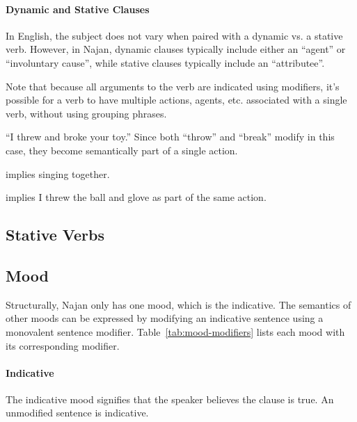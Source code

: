 
\paragraph{Dynamic and Stative Clauses} In English, the subject does not vary
when paired with a dynamic vs. a stative verb. However, in Najan, dynamic
clauses typically include either an ``agent'' or ``involuntary cause'', while
stative clauses typically include an ``attributee''.

Note that because all arguments to the verb are indicated using modifiers, it's
possible for a verb to have multiple actions, agents, etc. associated with a
single verb, without using grouping phrases.


``I threw and broke your toy.'' Since both ``throw'' and ``break'' modify
 in this case, they become semantically part of a single action.

 implies singing together.

 implies I threw the ball
and glove as part of the same action.


\subsection{Stative Verbs} \label{ssec:stative-verbs}


\subsection{Mood} \label{ssec:mood}

Structurally, Najan only has one mood, which is the indicative. The semantics of
other moods can be expressed by modifying an indicative sentence using a
monovalent sentence modifier. Table~\ref{tab:mood-modifiers} lists each mood
with its corresponding modifier.

\paragraph{Indicative} The indicative mood signifies that the speaker believes
the clause is true. An unmodified sentence is indicative.

